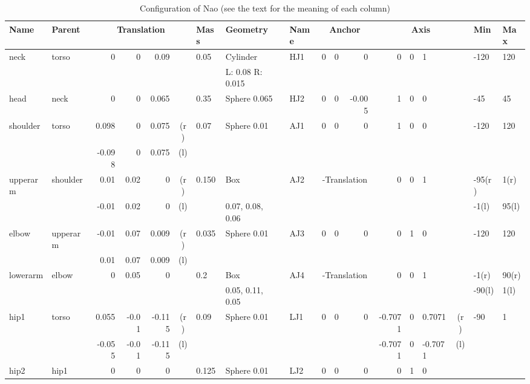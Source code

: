 \begin{landscape}
\begin{table}
  \centering
  \label{tab:nao-conf}
  \caption{Configuration of Nao (see the text for the meaning of each
    column)}
  \newcommand{\threegrid}[1]{\multicolumn{3}{c|}{#1}}
  \newcommand{\fourgrid}[1]{\multicolumn{4}{c|}{#1}}
  \begin{tabular}{|l|l|r@{,}r@{,}r@{}c|l|l|l|r@{,}r@{,}r|r@{,}r@{,}l@{}c|l|l|}
    \hline
    {\bf Name} & {\bf Parent} & \fourgrid{\bf Translation} &
    {\bf Mass} & {\bf Geometry} & {\bf Name} & \threegrid{\bf
      Anchor} & \fourgrid{\bf Axis} & {\bf Min} & {\bf Max} \\
    \hline
    neck & torso & 0&0&0.09& & 0.05 & Cylinder & HJ1 & 0&0&0 & 0&0&1& &
    -120 & 120\\
    & & \fourgrid{} & & L: 0.08 R: 0.015 & & \threegrid{} & \fourgrid{} & &\\
    \hline
    head & neck & 0&0&0.065& & 0.35 & Sphere 0.065 & HJ2 & 0&0&-0.005 &
    1&0&0& & -45 & 45\\
    \hline
    shoulder & torso & 0.098&0&0.075&(r)  & 0.07 & Sphere 0.01& AJ1 &
    0&0&0 & 1&0&0& & -120 & 120 \\
    & & -0.098 & 0 & 0.075&(l) & & & & \threegrid{} & \fourgrid{} & & \\
    \hline
    upperarm & shoulder & 0.01&0.02&0&(r) & 0.150 &
    Box & AJ2 & \threegrid{-Translation} & 0&0&1& & -95(r) & 1(r)  \\
    & & -0.01 & 0.02 & 0&(l) & & 0.07, 0.08, 0.06 & & \threegrid{} & \fourgrid{} & -1(l) & 95(l) \\
    \hline
    elbow & upperarm & -0.01&0.07&0.009&(r) &
    0.035 & Sphere 0.01 & AJ3 & 0&0&0 & 0&1&0& & -120 & 120 \\
    & & 0.01 & 0.07 & 0.009&(l) & & & & \threegrid{} & \fourgrid{} & &\\
    \hline
    lowerarm & elbow & 0&0.05&0& & 0.2 & Box & AJ4 &
    \threegrid{-Translation} & 0&0&1& & -1(r) & 90(r) \\
    & & \fourgrid{} & & 0.05, 0.11, 0.05 & & \threegrid{} & \fourgrid{} & -90(l) & 1(l) \\
    \hline
    hip1 & torso & 0.055&-0.01&-0.115&(r) &
    0.09 & Sphere 0.01 & LJ1 & 0&0&0 & -0.7071&0&0.7071&(r)  & -90 & 1 \\
    & & -0.055 & -0.01 & -0.115&(l) & & & & \threegrid{} & -0.7071&0&-0.7071&(l) & &\\
    \hline
    hip2 & hip1 & 0&0&0& & 0.125 & Sphere 0.01 & LJ2 & 0&0&0 & 0&1&0& &

\end{tabular}
\end{table}
\end{landscape}

